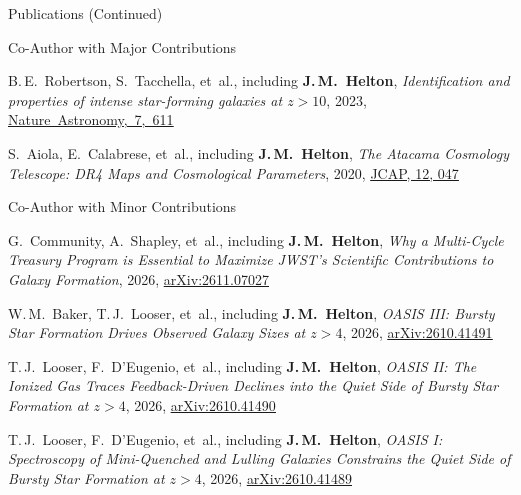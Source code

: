 \documentclass{JMH_CV}
\begin{document}
\begin{rSection}{Publications (Continued)}
\begin{rSubsection}{Co-Author with Major Contributions}{}{}{}
\begin{etaremune}
    \item B.\,E.~Robertson, S.~Tacchella, et~al., including \textbf{J.\,M.~Helton}, \textit{\mbox{Identification} and properties of intense star-forming galaxies at $\mathit{z > 10}$}, 2023, \href{https://www.scixplorer.org/abs/2023NatAs...7..611R/abstract}{\ul{\mbox{Nature Astronomy, 7, 611}}}

    \item S.~Aiola, E.~Calabrese, et~al., including \textbf{J.\,M.~Helton}, \textit{The Atacama Cosmology Telescope: DR4 Maps and Cosmological Parameters}, 2020, \href{https://www.scixplorer.org/abs/2020JCAP...12..047A/abstract}{\ul{JCAP, 12, 047}}

\end{etaremune}
\end{rSubsection}


\begin{rSubsection}{Co-Author with Minor Contributions}{}{}{}
\begin{etaremune}

    \item G.~Community, A.~Shapley, et~al., including \textbf{J.\,M.~Helton}, \textit{Why a Multi-Cycle Treasury Program is Essential to Maximize JWST's Scientific Contributions to Galaxy Formation}, 2026, \href{https://www.scixplorer.org/abs/2026arXiv261107027C/abstract}{\ul{arXiv:2611.07027}}

    \item W.\,M.~Baker, T.\,J.~Looser, et~al., including \textbf{J.\,M.~Helton}, \textit{OASIS III: Bursty Star Formation Drives Observed Galaxy Sizes at $\mathit{z > 4}$}, 2026, \href{https://www.scixplorer.org/abs/2026arXiv261041491B/abstract}{\ul{arXiv:2610.41491}}

    \item T.\,J.~Looser, F.~D'Eugenio, et~al., including \textbf{J.\,M.~Helton}, \textit{OASIS II: The Ionized Gas Traces Feedback-Driven Declines into the Quiet Side of Bursty Star Formation at $\mathit{z > 4}$}, 2026, \href{https://www.scixplorer.org/abs/2026arXiv261041490L/abstract}{\ul{arXiv:2610.41490}}

    \item T.\,J.~Looser, F.~D'Eugenio, et~al., including \textbf{J.\,M.~Helton}, \textit{OASIS I: Spectroscopy of Mini-Quenched and Lulling Galaxies Constrains the Quiet Side of Bursty Star Formation at $\mathit{z > 4}$}, 2026, \href{https://www.scixplorer.org/abs/2026arXiv261041489L/abstract}{\ul{arXiv:2610.41489}}


\end{etaremune}
\end{rSubsection}
\end{rSection}
\end{document}
